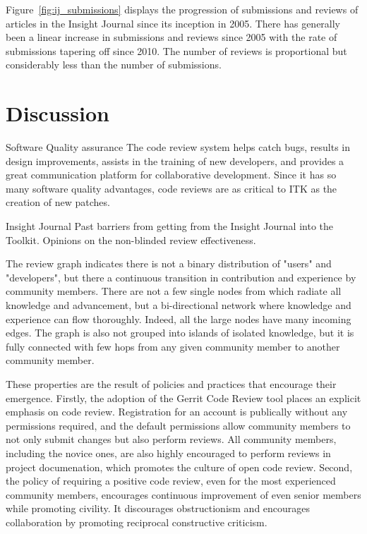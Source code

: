 \documentclass{frontiersENG} %
\begin{document}
Figure~\ref{fig:ij_submissions} displays the progression of submissions and
reviews of articles in the Insight Journal since its inception in 2005.  There
has generally been a linear increase in submissions and reviews since 2005
with the rate of submissions tapering off since 2010.  The number of reviews
is proportional but considerably less than the number of submissions.



\section{Discussion}
Software Quality assurance
The code review system helps catch bugs, results in design improvements, assists in the training of new developers, and provides a great communication platform for collaborative development. Since it has so many software quality advantages, code reviews are as critical to ITK as the creation of new patches.


Insight Journal
Past barriers from getting from the Insight Journal into the Toolkit.  Opinions on the
non-blinded review effectiveness.

The review graph indicates there is not a binary distribution of "users" and
"developers", but there a continuous transition in contribution and experience
by community members. There are not a few single nodes from which radiate all
knowledge and advancement, but a bi-directional network where knowledge and
experience can flow thoroughly.  Indeed, all the large nodes have many
incoming edges. The graph is also not grouped into islands of
isolated knowledge, but it is fully connected with few hops from any given
community member to another community member.

These properties are the result of policies and practices that encourage their
emergence. Firstly, the adoption of the Gerrit Code Review tool places an
explicit emphasis on code review.  Registration for an account is publically
without any permissions required, and the default permissions allow community
members to not only submit changes but also perform reviews. All community
members, including the novice ones, are also highly encouraged to perform
reviews in project documenation, which promotes the culture of open code
review. Second, the policy of requiring a positive code review, even for the
most experienced community members, encourages continuous improvement of even
senior members while promoting civility. It discourages obstructionism and
encourages collaboration by promoting reciprocal constructive criticism.
\end{document}
